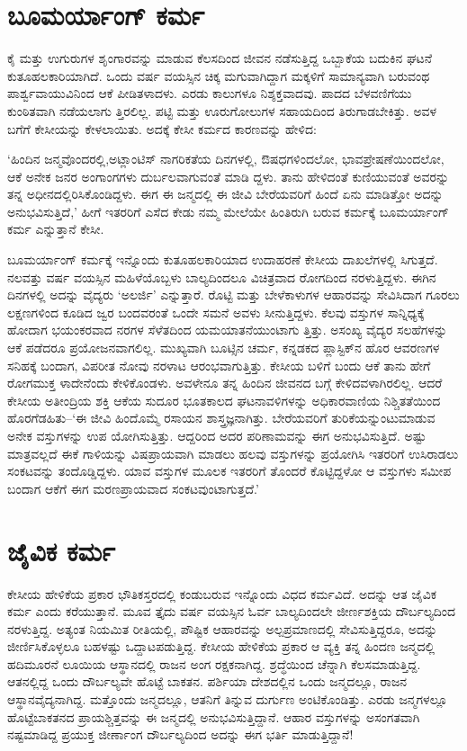 \section{ಬೂಮರ್ಯಾಂಗ್ ಕರ್ಮ}

ಕೈ ಮತ್ತು ಉಗುರುಗಳ ಶೃಂಗಾರವನ್ನು ಮಾಡುವ ಕೆಲಸದಿಂದ ಜೀವನ ನಡೆಸುತ್ತಿದ್ದ ಒಬ್ಬಾಕೆಯ ಬದುಕಿನ ಘಟನೆ ಕುತೂಹಲಕಾರಿಯಾಗಿದೆ. ಒಂದು ವರ್ಷ ವಯಸ್ಸಿನ ಚಿಕ್ಕ ಮಗುವಾಗಿದ್ದಾಗ ಮಕ್ಕಳಿಗೆ ಸಾಮಾನ್ಯವಾಗಿ ಬರುವಂಥ ಪಾರ್ಶ್ವವಾಯುವಿನಿಂದ ಆಕೆ ಪೀಡಿತಳಾದಳು. ಎರಡು ಕಾಲುಗಳೂ ನಿಶ್ಶಕ್ತವಾದವು. ಪಾದದ ಬೆಳವಣಿಗೆಯು ಕುಂಠಿತವಾಗಿ ನಡೆಯಲಾಗು ತ್ತಿರಲಿಲ್ಲ. ಪಟ್ಟಿ ಮತ್ತು ಊರುಗೋಲುಗಳ ಸಹಾಯದಿಂದ ತಿರುಗಾಡಬೇಕಿತ್ತು. ಅವಳ ಬಗೆಗೆ ಕೇಸೀಯನ್ನು ಕೇಳಲಾಯಿತು. ಅದಕ್ಕೆ ಕೇಸೀ ಕರ್ಮದ ಕಾರಣವನ್ನು ಹೇಳಿದ:

‘ಹಿಂದಿನ ಜನ್ಮವೊಂದರಲ್ಲಿ,ಅಟ್ಲಾಂಟಿಸ್ ನಾಗರಿಕತೆಯ ದಿನಗಳಲ್ಲಿ, ಔಷಧಗಳಿಂದಲೋ, ಭಾವಪ್ರೇಷಣೆಯಿಂದಲೋ, ಆಕೆ ಅನೇಕ ಜನರ ಅಂಗಾಂಗಗಳು ದುರ್ಬಲವಾಗುವಂತೆ ಮಾಡಿ ದ್ದಳು. ತಾನು ಹೇಳಿದಂತೆ ಕುಣಿಯುವಂತೆ ಅವರನ್ನು ತನ್ನ ಅಧೀನದಲ್ಲಿರಿಸಿಕೊಂಡಿದ್ದಳು. ಈಗ ಈ ಜನ್ಮದಲ್ಲಿ ಈ ಜೀವಿ ಬೇರೆಯವರಿಗೆ ಹಿಂದೆ ಏನು ಮಾಡಿತ್ತೋ ಅದನ್ನು ಅನುಭವಿಸುತ್ತಿದೆ,’ ಹೀಗೆ ಇತರರಿಗೆ ಎಸೆದ ಕೇಡು ನಮ್ಮ ಮೇಲೆಯೇ ಹಿಂತಿರುಗಿ ಬರುವ ಕರ್ಮಕ್ಕೆ ಬೂಮರ್ಯಾಂಗ್ ಕರ್ಮ  ಎನ್ನುತ್ತಾನೆ ಕೇಸೀ.

ಬೂಮರ್ಯಾಂಗ್ ಕರ್ಮಕ್ಕೆ ಇನ್ನೊಂದು ಕುತೂಹಲಕಾರಿಯಾದ ಉದಾಹರಣೆ ಕೇಸೀಯ ದಾಖಲೆಗಳಲ್ಲಿ ಸಿಗುತ್ತದೆ. ನಲವತ್ತು ವರ್ಷ ವಯಸ್ಸಿನ ಮಹಿಳೆಯೊಬ್ಬಳು ಬಾಲ್ಯದಿಂದಲೂ ವಿಚಿತ್ರವಾದ ರೋಗದಿಂದ ನರಳುತ್ತಿದ್ದಳು. ಈಗಿನ ದಿನಗಳಲ್ಲಿ ಅದನ್ನು ವೈದ್ಯರು ‘ಅಲರ್ಜಿ’ ಎನ್ನುತ್ತಾರೆ. ರೊಟ್ಟಿ ಮತ್ತು ಬೇಳೆಕಾಳುಗಳ ಆಹಾರವನ್ನು ಸೇವಿಸಿದಾಗ ಗೂರಲು ಲಕ್ಷಣಗಳಿಂದ ಕೂಡಿದ ಜ್ವರ ಬಂದವರಂತೆ ಒಂದೇ ಸಮನೆ ಅವಳು ಸೀನುತ್ತಿದ್ದಳು. ಕೆಲವು ವಸ್ತುಗಳ ಸಾನ್ನಿಧ್ಯಕ್ಕೆ ಹೋದಾಗ ಭಯಂಕರವಾದ ನರಗಳ ಸೆಳೆತದಿಂದ ಯಮಯಾತನೆಯುಂಟಾಗು ತ್ತಿತ್ತು. ಅಸಂಖ್ಯ ವೈದ್ಯರ ಸಲಹೆಗಳನ್ನು ಆಕೆ ಪಡೆದರೂ ಪ್ರಯೋಜನವಾಗಲಿಲ್ಲ. ಮುಖ್ಯವಾಗಿ ಬೂಟ್ಸಿನ ಚರ್ಮ, ಕನ್ನಡಕದ ಪ್ಲಾಸ್ಟಿಕ್​ನ ಹೊರ ಆವರಣಗಳ ಸನಿಹಕ್ಕೆ ಬಂದಾಗ, ವಿಪರೀತ ನೋವು ನರಳಾಟ ಆರಂಭವಾಗುತ್ತಿತ್ತು. ಕೇಸೀಯ ಬಳಿಗೆ ಬಂದು ಆಕೆ ತಾನು ಹೇಗೆ ರೋಗಮುಕ್ತ ಳಾದೇನೆಂದು ಕೇಳಿಕೊಂಡಳು. ಅವಳೇನೂ ತನ್ನ ಹಿಂದಿನ ಜೀವನದ ಬಗ್ಗೆ ಕೇಳಿದವಳಾಗಿರಲಿಲ್ಲ. ಆದರೆ ಕೇಸೀಯ ಅತೀಂದ್ರಿಯ ಶಕ್ತಿ ಆಕೆಯ ಸುದೂರ ಭೂತಕಾಲದ ಘಟನಾವಳಿಗಳನ್ನು ಅಧಿಕಾರವಾಣಿಯ ನಿಶ್ಚಿತತೆಯಿಂದ ಹೊರಗೆಡಹಿತು–‘ಈ ಜೀವಿ ಹಿಂದೊಮ್ಮೆ ರಸಾಯನ ಶಾಸ್ತ್ರಜ್ಞನಾಗಿತ್ತು. ಬೇರೆಯವರಿಗೆ ತುರಿಕೆಯನ್ನುಂಟುಮಾಡುವ ಅನೇಕ ವಸ್ತುಗಳನ್ನು ಉಪ ಯೋಗಿಸುತ್ತಿತ್ತು. ಆದ್ದರಿಂದ ಅದರ ಪರಿಣಾಮವನ್ನು ಈಗ ಅನುಭವಿಸುತ್ತಿದೆ. ಅಷ್ಟು ಮಾತ್ರವಲ್ಲದೆ ಈಕೆ ಗಾಳಿಯನ್ನು ವಿಷಪ್ರಾಯವಾಗಿ ಮಾಡಲು ಹಲವು ವಸ್ತುಗಳನ್ನು ಪ್ರಯೋಗಿಸಿ ಇತರರಿಗೆ ಉಸಿರಾಡಲು ಸಂಕಟವನ್ನು ತಂದೊಡ್ಡಿದ್ದಳು. ಯಾವ ವಸ್ತುಗಳ ಮೂಲಕ ಇತರರಿಗೆ ತೊಂದರೆ ಕೊಟ್ಟಿದ್ದಳೋ ಆ ವಸ್ತುಗಳು ಸಮೀಪ ಬಂದಾಗ ಆಕೆಗೆ ಈಗ ಮರಣಪ್ರಾಯವಾದ ಸಂಕಟವುಂಟಾಗುತ್ತದೆ.’


\section{ಜೈವಿಕ ಕರ್ಮ}

ಕೇಸೀಯ ಹೇಳಿಕೆಯ ಪ್ರಕಾರ ಭೌತಿಕಸ್ತರದಲ್ಲಿ ಕಂಡುಬರುವ ಇನ್ನೊಂದು ವಿಧದ ಕರ್ಮವಿದೆ. ಅದನ್ನು ಆತ ಜೈವಿಕ ಕರ್ಮ  ಎಂದು ಕರೆಯುತ್ತಾನೆ. ಮೂವ ತ್ತೈದು ವರ್ಷ ವಯಸ್ಸಿನ ಓರ್ವ ಬಾಲ್ಯದಿಂದಲೇ ಜೀರ್ಣಶಕ್ತಿಯ ದೌರ್ಬಲ್ಯದಿಂದ ನರಳುತ್ತಿದ್ದ. ಅತ್ಯಂತ ನಿಯಮಿತ ರೀತಿಯಲ್ಲಿ, ಪೌಷ್ಟಿಕ ಆಹಾರವನ್ನು ಅಲ್ಪಪ್ರಮಾಣದಲ್ಲಿ ಸೇವಿಸುತ್ತಿದ್ದರೂ, ಅದನ್ನು ಜೀರ್ಣಿಸಿಕೊಳ್ಳಲೂ ಬಹಳಷ್ಟು ಒದ್ದಾಟಪಡುತ್ತಿದ್ದ. ಕೇಸೀಯ ಹೇಳಿಕೆಯ ಪ್ರಕಾರ ಆ ವ್ಯಕ್ತಿ ತನ್ನ ಹಿಂದಣ ಜನ್ಮದಲ್ಲಿ ಹದಿಮೂರನೆ ಲೂಯಿಯ ಆಸ್ಥಾನದಲ್ಲಿ ರಾಜನ ಅಂಗ ರಕ್ಷಕನಾಗಿದ್ದ. ಶ್ರದ್ಧೆಯಿಂದ ಚೆನ್ನಾಗಿ ಕೆಲಸಮಾಡುತ್ತಿದ್ದ. ಆತನಲ್ಲಿದ್ದ ಒಂದು ದೌರ್ಬಲ್ಯವೇ ಹೊಟ್ಟೆ ಬಾಕತನ. ಪರ್ಶಿಯಾ ದೇಶದಲ್ಲಿನ ಒಂದು ಜನ್ಮದಲ್ಲೂ, ರಾಜನ ಆಸ್ಥಾನವೈದ್ಯನಾಗಿದ್ದ. ಮತ್ತೊಂದು ಜನ್ಮದಲ್ಲೂ, ಆತನಿಗೆ ತಿನ್ನುವ ದುರ್ಗುಣ ಅಂಟಿಕೊಂಡಿತ್ತು. ಎರಡು ಜನ್ಮಗಳಲ್ಲೂ ಹೊಟ್ಟೆಬಾಕತನದ ಪ್ರಾಯಶ್ಚಿತ್ತವನ್ನು ಈ ಜನ್ಮದಲ್ಲಿ ಅನುಭವಿಸುತ್ತಿದ್ದಾನೆ. ಆಹಾರ ವಸ್ತುಗಳನ್ನು ಅಸಂಗತವಾಗಿ ನಷ್ಟಮಾಡಿದ್ದ ಪ್ರಯುಕ್ತ ಜೀರ್ಣಾಂಗ ದೌರ್ಬಲ್ಯದಿಂದ ಅದನ್ನು ಈಗ ಭರ್ತಿ ಮಾಡುತ್ತಿದ್ದಾನೆ!


